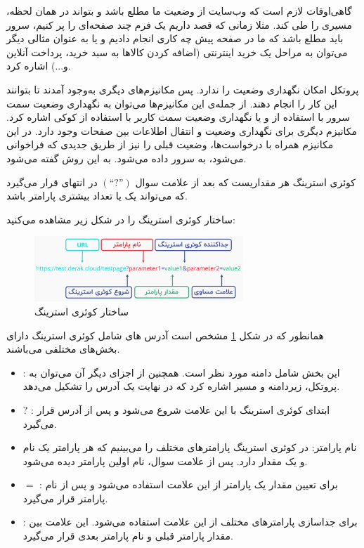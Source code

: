 ‏گاهی‌اوقات لازم است که وب‌سایت از وضعیت
\noindent\unskip{}
ما مطلع باشد و بتواند در همان لحظه، مسیری را طی کند. مثلا زمانی که قصد داریم یک فرم چند صفحه‌ای را پر کنیم، سرور باید مطلع باشد که ما در صفحه پیش چه کاری انجام دادیم و یا به عنوان مثالی دیگر می‌توان به مراحل یک خرید اینترنتی (اضافه کردن کالاها به سبد خرید، پرداخت آنلاین و...) اشاره کرد.

پروتکل
امکان نگهداری وضعیت را ندارد. پس مکانیزم‌های دیگری به‌وجود آمدند تا بتوانند این کار را انجام دهند. از جمله‌ی این مکانیزم‌ها می‌توان به نگهداری وضعیت سمت سرور با استفاده از 
و یا نگهداری وضعیت سمت کاربر
\noindent\unskip{}
با استفاده از کوکی
\noindent\unskip{}
اشاره کرد.
مکانیزم دیگری برای نگهداری وضعیت و انتقال اطلاعات بين صفحات وجود دارد. در این مکانیزم همراه با درخواست‌ها، وضعیت قبلی را نیز از طریق
جدیدی که فراخوانی می‌شود، به سرور داده می‌شود. به این روش
گفته می‌شود.

کوئری استرینگ هر مقداریست که بعد از علامت سوال $(“?”)$ در انتهای
قرار می‌گیرد که می‌تواند یک یا تعداد بیشتری پارامتر باشد.

ساختار کوئری استرینگ را در شکل زیر مشاهده می‌کنید:
\begin{figure}[H]
	\centering
	\includegraphics[width=0.7\textwidth]{./images/Chapter3/QueryStringStructure}	
	\caption[ساختار کوئری استرینگ]{ساختار کوئری استرینگ \cite{QueryString}}
	\label{ساختار کوئری}
\end{figure}
\noindent
\unskip

همانطور که در شکل
\ref{ساختار کوئری}
مشخص است آدرس های شامل کوئری استرینگ دارای بخش‌های مختلفی می‌باشند.
\begin{itemize}
	\item 
	 : این بخش شامل دامنه مورد نظر است. همچنین از اجزای دیگر آن می‌توان به پروتکل، زیردامنه و مسیر اشاره کرد که در نهایت یک آدرس را تشکیل می‌دهد.
	\item
	$?$ : ابتدای کوئری استرینگ با این علامت شروع می‌شود و پس از آدرس قرار می‌گیرد.
	\item
	نام پارامتر: در کوئری استرینگ پارامترهای مختلف را می‌بینیم که هر پارامتر یک نام
	\noindent\unskip{}
	و یک مقدار
	\noindent\unskip{}
	دارد. پس از علامت سوال، نام اولین پارامتر دیده می‌شود.
	\item
	$=$ : برای تعیین مقدار یک پارامتر از این علامت استفاده می‌شود و پس از نام پارامتر قرار می‌گیرد.
	\item
	\lr{\&} : برای جداسازی پارامتر‌های مختلف از این علامت استفاده می‌شود. این علامت بین مقدار پارامتر قبلی و نام پارامتر بعدی قرار می‌گیرد.
\end{itemize}

